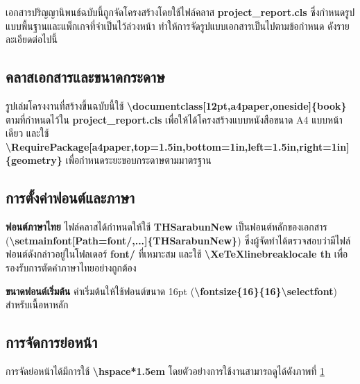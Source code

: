 \hspace*{1.5em} %
เอกสารปริญญานิพนธ์ฉบับนี้ถูกจัดโครงสร้างโดยใช้ไฟล์คลาส \textbf{project\_report.cls} ซึ่งกำหนดรูปแบบพื้นฐานและแพ็กเกจที่จำเป็นไว้ล่วงหน้า ทำให้การจัดรูปแบบเอกสารเป็นไปตามข้อกำหนด ดังรายละเอียดต่อไปนี้

\subsection{คลาสเอกสารและขนาดกระดาษ}

\hspace*{1.5em} %
รูปเล่มโครงงานที่สร้างขึ้นฉบับนี้ใช้ \textbf{\textbackslash documentclass[12pt,a4paper,oneside]\{book\}} ตามที่กำหนดไว้ใน \textbf{project\_report.cls} เพื่อให้ได้โครงสร้างแบบหนังสือขนาด A4 แบบหน้าเดียว และใช้ \textbf{\textbackslash RequirePackage[a4paper,top=1.5in,bottom=1in,left=1.5in,right=1in]\{geometry\}} เพื่อกำหนดระยะขอบกระดาษตามมาตรฐาน


\subsection{การตั้งค่าฟอนต์และภาษา}
\begin{mycustomitem2}
    \item \textbf{ฟอนต์ภาษาไทย} ไฟล์คลาสได้กำหนดให้ใช้ \textbf{THSarabunNew} เป็นฟอนต์หลักของเอกสาร (\textbf{\textbackslash setmainfont[Path=font/,...]\{THSarabunNew\}}) ซึ่งผู้จัดทำได้ตรวจสอบว่ามีไฟล์ฟอนต์ดังกล่าวอยู่ในโฟลเดอร์ \textbf{font/} ที่เหมาะสม และใช้ \textbf{\textbackslash XeTeXlinebreaklocale th} เพื่อรองรับการตัดคำภาษาไทยอย่างถูกต้อง
    \item \textbf{ขนาดฟอนต์เริ่มต้น} ค่าเริ่มต้นให้ใช้ฟอนต์ขนาด 16pt (\textbf{\textbackslash fontsize\{16\}\{16\}\textbackslash selectfont}) สำหรับเนื้อหาหลัก
\end{mycustomitem2}


\subsection{การจัดการย่อหน้า}
\hspace*{1.5em} %
การจัดย่อหน้าได้มีการใช้ \textbf{\textbackslash hspace*{1.5em}} โดยตัวอย่างการใช้งานสามารถดูได้ดังภาพที่ \ref{fig3:ExampleHspace}

\begin{figure}[htbp]
\centering
{}
\caption{}
\label{fig3:ExampleHspace}
\end{figure}


